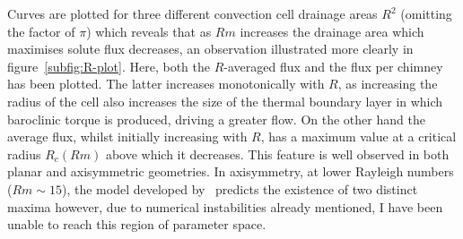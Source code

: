 \documentclass[11pt,twocolumn]{article}
\begin{document}
Curves are plotted for three different convection cell drainage areas $R^2$ (omitting the factor of $\pi$) which reveals that as $Rm$ increases the drainage area which maximises solute flux decreases, an observation illustrated more clearly in figure~\ref{subfig:R-plot}. Here, both the $R$-averaged flux and the flux per chimney has been plotted. The latter increases monotonically with $R$, as increasing the radius of the cell also increases the size of the thermal boundary layer in which baroclinic torque is produced, driving a greater flow. On the other hand the average flux, whilst initially increasing with $R$, has a maximum value at a critical radius $R_c(Rm)$ above which it decreases. This feature is well observed in both planar and axisymmetric geometries. In axisymmetry, at lower Rayleigh numbers ($Rm \sim 15$), the model developed by~\citet*{rees-jones-worster-13} predicts the existence of two distinct maxima however, due to numerical instabilities already mentioned, I have been unable to reach this region of parameter space. 

\end{document}
